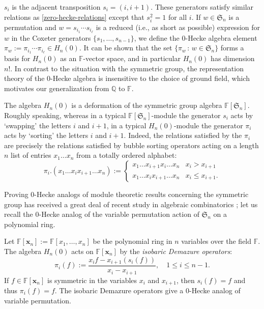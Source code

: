 \documentclass[10pt]{amsart}
\theoremstyle{definition}
\newcommand{\symm}{{\mathfrak{S}}}
\newcommand{\QQ}{{\mathbb {Q}}}
\newcommand{\FF}{{\mathbb{F}}}
\newcommand{\xx}{{\mathbf {x}}}
\begin{document}
$s_i$ is the adjacent transposition $s_i = (i, i+1)$.
These generators satisfy similar relations as \eqref{zero-hecke-relations} except that $s_i^2=1$ for all $i$. 
If $w \in \symm_n$ is a permutation and $w = s_{i_1} \cdots s_{i_{\ell}}$ is a reduced (i.e., as short as possible)
expression for $w$
in the Coxeter generators $\{s_1, \dots, s_{n-1}\}$, we define 
the 0-Hecke algebra element $\pi_w := \pi_{i_1} \cdots \pi_{i_{\ell}} \in H_n(0)$.  It can be shown that the 
set $\{ \pi_w \,:\, w \in \symm_n \}$ forms a basis for $H_n(0)$ as an $\FF$-vector space, and in particular
$H_n(0)$ has dimension $n!$. 
In contrast to the situation with the symmetric group, the representation theory of the 
0-Hecke algebra is insensitive to the choice of ground field, which motivates our generalization
from $\QQ$ to $\FF$.


The algebra $H_n(0)$ is a deformation of the symmetric group algebra
$\FF[\symm_n]$.  Roughly speaking, whereas in a typical $\FF[\symm_n]$-module the 
generator $s_i$ acts by `swapping' the letters $i$ and $i+1$, in a typical 
$H_n(0)$-module the generator $\pi_i$ acts by `sorting' the letters $i$ and $i+1$.
Indeed, the relations satisfied by the $\pi_i$ are precisely the relations satisfied by bubble sorting operators
acting on a length $n$ list of entries $x_1 \dots x_n$  from a totally ordered alphabet:
\begin{equation}
\pi_i .( x_1 \dots x_i x_{i+1} \dots x_n) := \begin{cases}
x_1 \dots x_{i+1} x_i \dots x_n & x_i > x_{i+1} \\
x_1 \dots x_i x_{i+1} \dots x_n & x_i \leq x_{i+1}.
\end{cases}
\end{equation}


Proving 0-Hecke analogs of  module theoretic results concerning the symmetric group has received
a great deal of recent study in algebraic combinatorics \cite{BBSSZ, Huang, HuangTab, VT}; let us 
recall the 0-Hecke analog of the variable permutation action of $\symm_n$ on a polynomial ring.

Let $\FF[\xx_n] := \FF[x_1, \dots, x_n]$ be the polynomial ring in $n$ variables over the field $\FF$.
The algebra $H_n(0)$ acts on $\FF[\xx_n]$ by the \emph{isobaric Demazure operators}:
\begin{equation}\label{Demazure}
\pi_i(f) := \frac{x_i f - x_{i+1} (s_i(f))}{x_i - x_{i+1}},\quad 1\le i\le n-1.
\end{equation}
If $f \in \FF[\xx_n]$ is symmetric in the variables $x_i$ and $x_{i+1}$, then $s_i(f) = f$ and thus $\pi_i(f) = f$.
The isobaric Demazure operators give a 0-Hecke analog of variable permutation.
\end{document}
